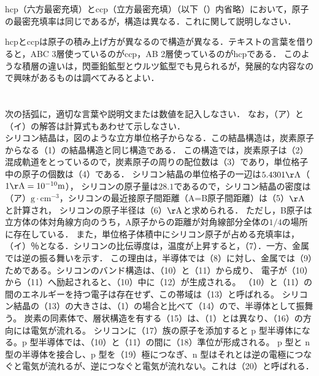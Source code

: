 \documentclass[dvipdfmx]{article}
\begin{document}
  \section{}
    \begin{tcolorbox}[title=問題]
      hcp（六方最密充填）とccp（立方最密充填）（以下（）内省略）において，原子の最密充填率は同じであるが，構造は異なる．これに関して説明しなさい．
    \end{tcolorbox}
    \begin{tcolorbox}[title=解答]
      hcpとccpは原子の積み上げ方が異なるので構造が異なる．テキストの言葉を借りると，ABC 3層使っているのがccp，AB 2層使っているのがhcpである．
      このような積層の違いは，閃亜鉛鉱型とウルツ鉱型でも見られるが，発展的な内容なので興味があるものは調べてみるとよい．
    \end{tcolorbox}

  \section{}
    \begin{tcolorbox}[title=問題]
    次の括弧に，適切な言葉や説明文または数値を記入しなさい． なお，（ア）と（イ）の解答は計算式もあわせて示しなさい．\\
    シリコン結晶は，図のような立方単位格子からなる．この結晶構造は，炭素原子からなる（1）の結晶構造と同じ構造である．
    この構造では，炭素原子は（2）混成軌道をとっているので，炭素原子の周りの配位数は（3）であり，単位格子中の原子の個数は（4）である．
    シリコン結晶の単位格子の一辺は$ 5.4301\mathrm{\AA}$（$1 \mathrm{\AA}=10^{-10}\mathrm{m}$），
    シリコンの原子量は$28.1$であるので，シリコン結晶の密度は（ア）$\mathrm{g \cdot cm^{-3}}$，シリコンの最近接原子間距離（A=B原子間距離）は（5）$\mathrm{\AA}$ と計算され，
    シリコンの原子半径は（6）$\mathrm{\AA}$と求められる．
    ただし，B原子は立方体の体対角線方向のうち，A原子からの距離が対角線部分全体の$1/4$の場所に存在している．
    また，単位格子体積中にシリコン原子が占める充填率は，（イ）％となる．シリコンの比伝導度は，温度が上昇すると，（7）．一方、金属では逆の振る舞いを示す．
    この理由は，半導体では（8）に対し、金属では（9）ためである。シリコンのバンド構造は、（10）と（11）から成り、
    電子が（10）から（11）へ励起されると、（10）中に（12）が生成される。
    （10）と（11）の間のエネルギーを持つ電子は存在せず、この帯域は（13）と呼ばれる。
    シリコン結晶の（13）の大きさは、（1）の場合と比べて（14）ので、半導体として振舞う。
    炭素の同素体で、層状構造を有する（15）は、（1）とは異なり、（16）の方向には電気が流れる。
    シリコンに（17）族の原子を添加すると p 型半導体になる。p 型半導体では、（10）と（11）の間に（18）準位が形成される。
    p 型と n 型の半導体を接合し、p 型を（19）極につなぎ、n 型はそれとは逆の電極につなぐと電気が流れるが、逆につなぐと電気が流れない。これは（20）と呼ばれる．
    \end{tcolorbox}
\end{document}
